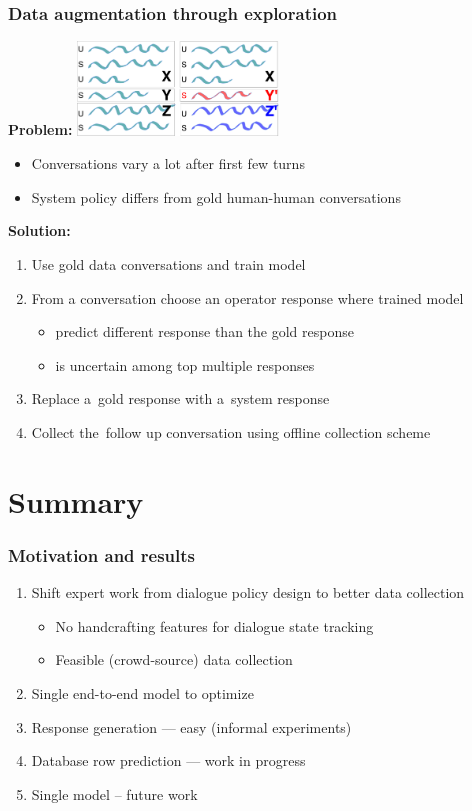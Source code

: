\documentclass[10pt, compress,british,xcolor={svgnames,dvipsnames,x11names},trans]{beamer}
\begin{document}
\begin{frame}\frametitle{Data augmentation through exploration}
    {\bf Problem:} \hfill \includegraphics[width=0.4\textwidth]{./misunderstaning}
    \begin{itemize}
        \item Conversations vary a lot after first few turns
        \item System policy differs from gold human-human conversations
    \end{itemize}
    {\bf Solution:} \\
    \begin{enumerate}
        \item Use gold data conversations and train model   
        \item From a conversation choose an operator response where trained model
            \begin{itemize}
                \item predict different response than the gold response
                \item is uncertain among top multiple responses
            \end{itemize}
        \item Replace a~gold response with a~system response
        \item Collect the~follow up conversation using offline collection scheme  
    \end{enumerate}
\end{frame}

\section{Summary}

\begin{frame}\frametitle{Motivation and results}
    \begin{enumerate}
        \item Shift expert work from dialogue policy design to better data collection 
        \begin{itemize}
            \item No handcrafting features for dialogue state tracking~\cite{platek_recurrent_2016}
            \item Feasible (crowd-source) data collection~\cite{platek2016wochat}
        \end{itemize}
        \item Single end-to-end model to optimize
            \item Response generation --- easy (informal experiments)
            \item Database row prediction --- work in progress
            \item Single model -- future work
    \end{enumerate}
\end{frame}
\end{document}
